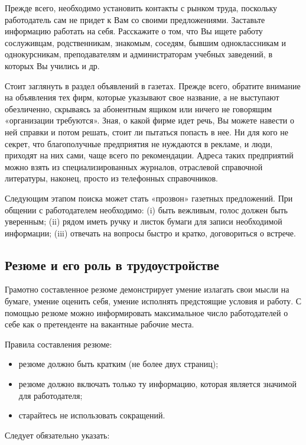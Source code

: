 Прежде всего, необходимо установить контакты с рынком труда, поскольку работодатель сам не придет к Вам со своими предложениями. Заставьте информацию работать на себя. Расскажите о том, что Вы ищете работу сослуживцам, родственникам, знакомым, соседям, бывшим одноклассникам и однокурсникам, преподавателям и администраторам учебных заведений, в которых Вы учились и др.

Стоит заглянуть в раздел объявлений в газетах. Прежде всего, обратите внимание на объявления тех фирм, которые указывают свое название, а не выступают обезличенно, скрываясь за абонентным ящиком или ничего не говорящим «организации требуются». Зная, о какой фирме идет речь, Вы можете навести о ней справки и потом решать, стоит ли пытаться попасть в нее. Ни для кого не секрет, что благополучные предприятия не нуждаются в рекламе, и люди, приходят на них сами, чаще всего по рекомендации. Адреса таких предприятий можно взять из специализированных журналов, отраслевой справочной литературы, наконец, просто из телефонных справочников.

Следующим этапом поиска может стать «прозвон» газетных предложений. При общении с работодателем необходимо:
(i) быть вежливым, голос должен быть уверенным;
(ii) рядом иметь ручку и листок бумаги для записи необходимой информации;
(iii) отвечать на вопросы быстро и кратко, договориться о встрече.

\subsection{Резюме и его роль в трудоустройстве}
Грамотно составленное резюме демонстрирует умение излагать свои мысли на бумаге, умение оценить себя, умение исполнять предстоящие условия и работу. С помощью резюме можно информировать максимальное число работодателей о себе как о претенденте на вакантные рабочие места.

Правила составления резюме:

\begin{itemize}[noitemsep, label=--]
    \item резюме должно быть кратким (не более двух страниц);
    \item резюме должно включать только ту информацию, которая является значимой для работодателя;
    \item старайтесь не использовать сокращений.
\end{itemize}

Следует обязательно указать:

